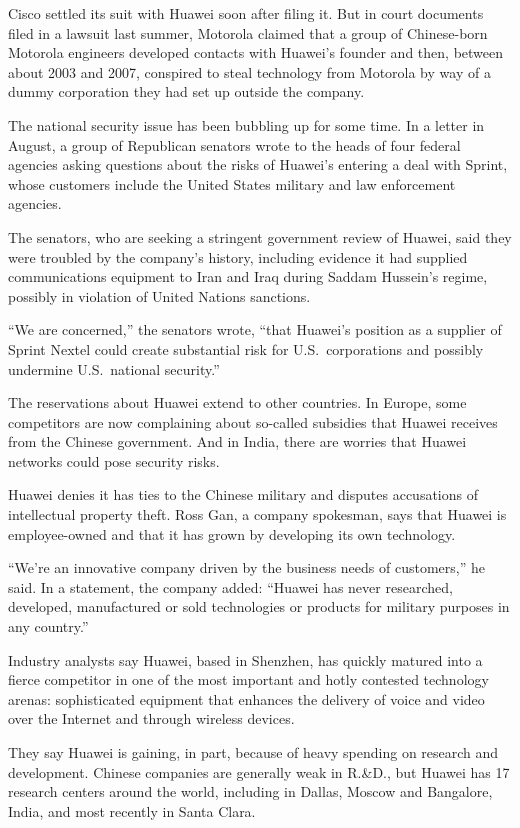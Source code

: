 ﻿\documentclass[12pt]{article}
\begin{document}
Cisco settled its suit with Huawei soon after filing it. But in court documents filed in a lawsuit
last summer, Motorola claimed that a group of Chinese-born Motorola engineers developed contacts
with Huawei's founder and then, between about 2003 and 2007, conspired to steal technology from
Motorola by way of a dummy corporation they had set up outside the company.

The national security issue has been bubbling up for some time. In a letter in August, a group of
Republican senators wrote to the heads of four federal agencies asking questions about the risks of
Huawei's entering a deal with Sprint, whose customers include the United States military and law
enforcement agencies.

The senators, who are seeking a stringent government review of Huawei, said they were troubled by
the company's history, including evidence it had supplied communications equipment to Iran and Iraq
during Saddam Hussein's regime, possibly in violation of United Nations sanctions.

``We are concerned,'' the senators wrote, ``that Huawei's position as a supplier of Sprint Nextel
could create substantial risk for U.S.~corporations and possibly undermine U.S.~national security.''

The reservations about Huawei extend to other countries. In Europe, some competitors are now
complaining about so-called subsidies that Huawei receives from the Chinese government. And in
India, there are worries that Huawei networks could pose security risks.

Huawei denies it has ties to the Chinese military and disputes accusations of intellectual property
theft. Ross Gan, a company spokesman, says that Huawei is employee-owned and that it has grown by
developing its own technology.

``We're an innovative company driven by the business needs of customers,'' he said. In a statement,
the company added: ``Huawei has never researched, developed, manufactured or sold technologies or
products for military purposes in any country.''

Industry analysts say Huawei, based in Shenzhen, has quickly matured into a fierce competitor in one
of the most important and hotly contested technology arenas: sophisticated equipment that enhances
the delivery of voice and video over the Internet and through wireless devices.

They say Huawei is gaining, in part, because of heavy spending on research and development. Chinese
companies are generally weak in R.\&D., but Huawei has 17 research centers around the world,
including in Dallas, Moscow and Bangalore, India, and most recently in Santa Clara.
\end{document}
